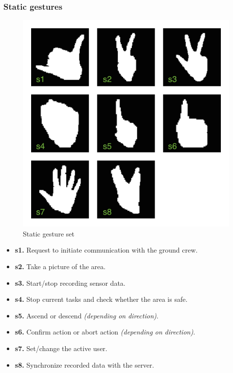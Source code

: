 \documentclass[a4paper,11pt,oneside]{article}
\begin{document}
    \subsubsection{Static gestures}

  \begin{figure}[H]
  \centering
  \includegraphics[scale=0.6]{static-gestureset.png}
  \caption{Static gesture set}
  \end{figure}
    
    \begin{itemize}
    \item \textbf{s1.} Request to initiate communication with the ground crew.
    \item \textbf{s2.} Take a picture of the area.
    \item \textbf{s3.} Start/stop recording sensor data.
    \item \textbf{s4.} Stop current tasks and check whether the area is safe.
    \item \textbf{s5.} Ascend or descend \textit{(depending on direction)}.
    \item \textbf{s6.} Confirm action or abort action \textit{(depending on direction)}.
    \item \textbf{s7.} Set/change the active user.
    \item \textbf{s8.} Synchronize recorded data with the server.
    \end{itemize}
    
\end{document}
